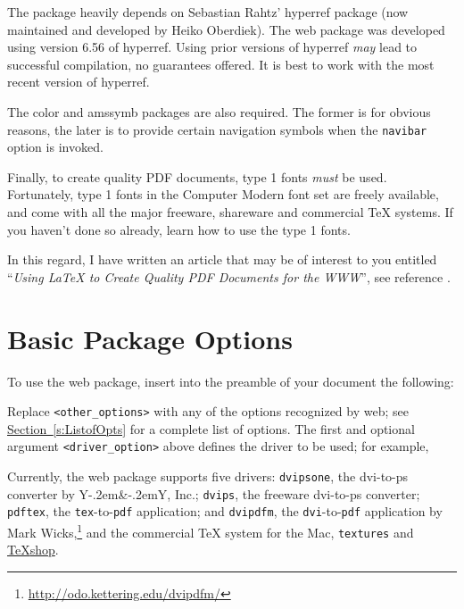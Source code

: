 \documentclass{article}
\def\Y&Y{Y\kern-.2em{\footnotesize\&}\kern-.2emY}
\begin{document}
The package heavily depends on Sebastian Rahtz' \textsf{hyperref}
package (now maintained and developed by Heiko Oberdiek). The
\textsf{web} package was developed using version 6.56 of
\textsf{hyperref}. Using prior versions of \textsf{hyperref}
\emph{may} lead to successful compilation, no guarantees offered.
It is best to work with the most recent version of
\textsf{hyperref}.

The \textsf{color} and \textsf{amssymb} packages are also
required. The former is for obvious reasons, the later is to
provide certain navigation symbols when the \texttt{navibar}
option is invoked.

Finally, to create quality PDF documents, type 1 fonts \emph{must}
be used. Fortunately, type 1 fonts in the Computer Modern font set
are freely available, and come with all the major
freeware, shareware and commercial \TeX{} systems. If you haven't
done so already, learn how to use the type 1 fonts.

In this regard, I have written an article that may be of interest
to you entitled ``\textit{Using \LaTeX{} to Create Quality PDF Documents
for the WWW}'', see reference \cite{article:Story:LaTeX}.

\section{Basic Package Options}

To use the \textsf{web} package, insert into the preamble of
your document the following:
\begin{sverbatim}
   \usepackage[<driver_option>,<other_options>]{web}
\end{sverbatim}
\noindent Replace \verb+<other_options>+ with any of the options recognized by
\textsf{web}; see \hyperref[s:ListofOpts]{Section~\ref*{s:ListofOpts}}
for a complete list of options. The first and optional argument
\verb+<driver_option>+ above defines the driver to be used; for
example,
\begin{sverbatim}
   \usepackage[dvipsone]{web}
\end{sverbatim}
\noindent Currently, the \textsf{web} package supports five drivers:
\texttt{dvipsone}, the dvi-to-ps converter by \Y&Y, Inc.;
\texttt{dvips}, the freeware dvi-to-ps converter; \texttt{pdftex},
the \texttt{tex}-to-\texttt{pdf} application; and \texttt{dvipdfm},
the \texttt{dvi}-to-\texttt{pdf} application by Mark Wicks,\footnote{\url{http://odo.kettering.edu/dvipdfm/}} and the commercial \TeX{} system for the Mac, \texttt{textures} and \href{http://www.uoregon.edu/~koch/texshop/texshop.html}{{\TeX}shop}.
\end{document}
